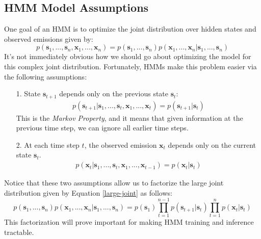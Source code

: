 \subsection{HMM Model Assumptions}
One goal of an HMM is to optimize the joint distribution over hidden states and observed emissions given by:
\begin{equation} \label{large-joint}
	p(\textbf{s}_1, ..., \textbf{s}_n, \textbf{x}_1, ..., \textbf{x}_n) = p(\textbf{s}_1, ..., \textbf{s}_n) p(\textbf{x}_1, ..., \textbf{x}_n | \textbf{s}_1, ..., \textbf{s}_n)
\end{equation}
It's not immediately obvious how we should go about optimizing the model for this complex joint distribution. Fortunately, HMMs make this problem easier via the following assumptions:
\begin{itemize}
    \item[1.] State $\textbf{s}_{t+1}$ depends only on the previous state $\textbf{s}_t$:
	    \begin{align*}
	    	p(\textbf{s}_{t+1} | \textbf{s}_{1}, ..., \textbf{s}_{t}, \textbf{x}_{1}, ..., \textbf{x}_{t}) = p(\textbf{s}_{t+1} | \textbf{s}_{t}) 
	    \end{align*}
    	This is the \textit{Markov Property}, and it means that given information at the previous time step, we can ignore all earlier time steps.
    \item[2.] At each time step $t$, the observed emission $\textbf{x}_t$ depends only on the current state $\textbf{s}_t$.
    	\begin{align*}
	    	p(\textbf{x}_{t} | \textbf{s}_{1}, ..., \textbf{s}_{t}, \textbf{x}_{1}, ..., \textbf{x}_{t-1}) = p(\textbf{x}_{t} | \textbf{s}_{t}) 
	    \end{align*}
\end{itemize}
Notice that these two assumptions allow us to factorize the large joint distribution given by Equation \ref{large-joint} as follows:
\begin{equation} \label{factorized-joint}
	p(\textbf{s}_1, ..., \textbf{s}_n) p(\textbf{x}_1, ..., \textbf{x}_n | \textbf{s}_1, ..., \textbf{s}_n) = p(\textbf{s}_1) \prod_{t=1}^{n-1} p(\textbf{s}_{t+1} | \textbf{s}_t) \prod_{t=1}^{n} p(\textbf{x}_t | \textbf{s}_t)
\end{equation}
This factorization will prove important for making HMM training and inference tractable.

